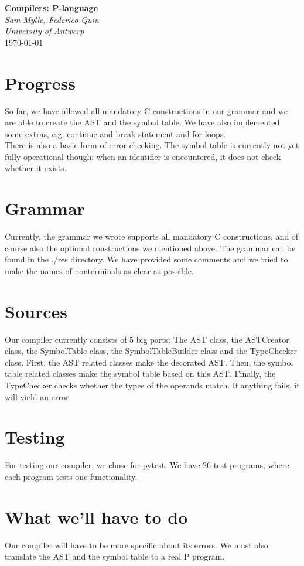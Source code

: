 \documentclass{article}
\begin{document}
\begin{titlepage}
   \begin{center}
      \Large\textbf{Compilers: P-language}\\
      \large\textit{Sam Mylle, Federico Quin \\ University of Antwerp} \\
      \today
   \end{center}
\end{titlepage}

\section{Progress}
So far, we have allowed all mandatory C constructions in our grammar and we are able to create the AST and the symbol table. We have also implemented some extras, e.g. continue and break statement and for loops. \\
There is also a basic form of error checking. The symbol table is currently not yet fully operational though: when an identifier is encountered, it does not check whether it exists.

\section{Grammar}
Currently, the grammar we wrote supports all mandatory C constructions, and of course also the optional constructions we mentioned above. The grammar can be found in the ./res directory. We have provided some comments and we tried to make the names of nonterminals as clear as possible.

\section{Sources}
Our compiler currently consists of 5 big parts: The AST class, the ASTCreator class, the SymbolTable class, the SymbolTableBuilder class and the TypeChecker class.
First, the AST related classes make the decorated AST. Then, the symbol table related classes make the symbol table based on this AST. Finally, the TypeChecker checks whether the types of the operands match. If anything fails, it will yield an error.

\section{Testing}
For testing our compiler, we chose for pytest. We have 26 test programs, where each program tests one functionality. 

\section{What we'll have to do}
Our compiler will have to be more specific about its errors. We must also translate the AST and the symbol table to a real P program. 
\end{document}
